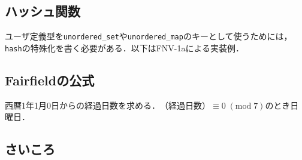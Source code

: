 \documentclass[landscape,twocolumn,9pt]{jsarticle}
\begin{document}
\subsection{ハッシュ関数}
ユーザ定義型を\texttt{unordered\_set}や\texttt{unordered\_map}のキーとして使うためには，
\texttt{hash}の特殊化を書く必要がある．以下はFNV-1aによる実装例．


\subsection{Fairfieldの公式}
西暦1年1月0日からの経過日数を求める．$\text{（経過日数）}\equiv 0\; (\mathrm{mod}\; 7)$のとき日曜日．


\subsection{さいころ}

\end{document}
